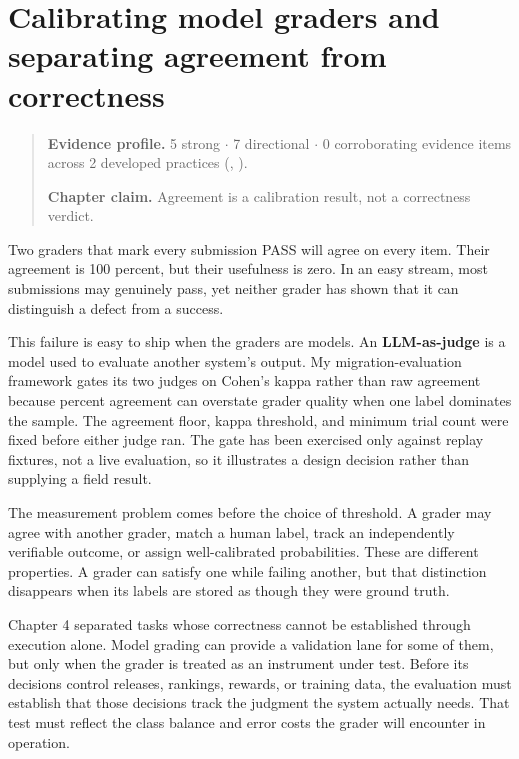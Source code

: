\chapter{Calibrating model graders and separating agreement from correctness}
\label{ch05-calibrating-model-graders-agreement-correctness}
\begin{quote}
\textbf{Evidence profile.} 5 strong \(\cdot\) 7 directional \(\cdot\) 0 corroborating evidence items across 2 developed practices (, ).

\textbf{Chapter claim.} Agreement is a calibration result, not a correctness verdict.
\end{quote}

Two graders that mark every submission PASS will agree on every item. Their agreement is 100 percent, but their usefulness is zero. In an easy stream, most submissions may genuinely pass, yet neither grader has shown that it can distinguish a defect from a success.

This failure is easy to ship when the graders are models. An \textbf{LLM-as-judge} is a model used to evaluate another system's output. My migration-evaluation framework gates its two judges on Cohen's kappa rather than raw agreement because percent agreement can overstate grader quality when one label dominates the sample. The agreement floor, kappa threshold, and minimum trial count were fixed before either judge ran. The gate has been exercised only against replay fixtures, not a live evaluation, so it illustrates a design decision rather than supplying a field result.

The measurement problem comes before the choice of threshold. A grader may agree with another grader, match a human label, track an independently verifiable outcome, or assign well-calibrated probabilities. These are different properties. A grader can satisfy one while failing another, but that distinction disappears when its labels are stored as though they were ground truth.

Chapter 4 separated tasks whose correctness cannot be established through execution alone. Model grading can provide a validation lane for some of them, but only when the grader is treated as an instrument under test. Before its decisions control releases, rankings, rewards, or training data, the evaluation must establish that those decisions track the judgment the system actually needs. That test must reflect the class balance and error costs the grader will encounter in operation.

